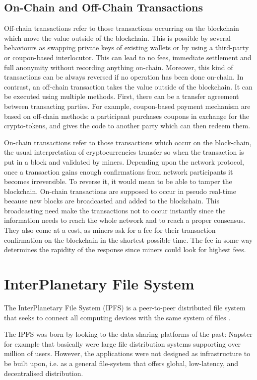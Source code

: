 \documentclass[preprint]{elsarticle}
\begin{document}
\subsection{On-Chain and Off-Chain Transactions}
Off-chain transactions refer to those transactions occurring on the blockchain which move the value outside of the blockchain. This is possible by several behaviours as swapping private keys of existing wallets or by using a third-party or coupon-based interlocutor. This can lead to no fees, immediate settlement and full anonymity without recording anything on-chain. Moreover, this kind of transactions can be always reversed if no operation has been done on-chain. In contrast, an off-chain transaction takes the value outside of the blockchain. It can be executed using multiple methods. First, there can be a transfer agreement between transacting parties. For example, coupon-based payment mechanism are based on off-chain methods: a participant purchases coupons in exchange for the crypto-tokens, and gives the code to another party which can then redeem them.

On-chain transactions refer to those transactions which occur on the block-chain, the usual interpretation of cryptocurrencies transfer so when the transaction is put in a block and validated by miners. Depending upon the network protocol, once a transaction gains enough confirmations from network participants it becomes irreversible. To reverse it, it would mean to be able to tamper the blockchain. On-chain transactions are supposed to occur in pseudo real-time because new blocks are broadcasted and added to the blockchain. This broadcasting need make the transactions not to occur instantly since the information needs to reach the whole network and to reach a proper consensus. They also come at a cost, as miners ask for a fee for their transaction confirmation on the blockchain in the shortest possible time. The fee in some way determines the rapidity of the response since miners could look for highest fees.

\section{InterPlanetary File System}
The InterPlanetary File System (IPFS) is a peer-to-peer distributed file system that seeks to connect all computing devices with the same system of files \cite{benet2014ipfs}.
 
The IPFS was born by looking to the data sharing platforms of the past: Napster for example that basically were large file distribution systems supporting over million of users. However, the applications were not designed as infrastructure to be built upon, i.e. as a general file-system that offers global, low-latency, and decentralised distribution.
\end{document}
